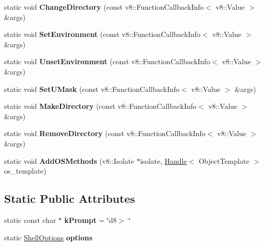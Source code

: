 \begin{DoxyCompactItemize}
\item 
\hypertarget{classv8_1_1_shell_aa08a16a91023b749f2d9e0956c8200e1}{}static void {\bfseries Change\+Directory} (const v8\+::\+Function\+Callback\+Info$<$ v8\+::\+Value $>$ \&args)\label{classv8_1_1_shell_aa08a16a91023b749f2d9e0956c8200e1}

\item 
\hypertarget{classv8_1_1_shell_a0977b415540cff06625e711b5d3e2625}{}static void {\bfseries Set\+Environment} (const v8\+::\+Function\+Callback\+Info$<$ v8\+::\+Value $>$ \&args)\label{classv8_1_1_shell_a0977b415540cff06625e711b5d3e2625}

\item 
\hypertarget{classv8_1_1_shell_ae7ac04fd17a20acf9fb66812b611170e}{}static void {\bfseries Unset\+Environment} (const v8\+::\+Function\+Callback\+Info$<$ v8\+::\+Value $>$ \&args)\label{classv8_1_1_shell_ae7ac04fd17a20acf9fb66812b611170e}

\item 
\hypertarget{classv8_1_1_shell_af3f66a1cd6b81cd69e43e9453092b50f}{}static void {\bfseries Set\+U\+Mask} (const v8\+::\+Function\+Callback\+Info$<$ v8\+::\+Value $>$ \&args)\label{classv8_1_1_shell_af3f66a1cd6b81cd69e43e9453092b50f}

\item 
\hypertarget{classv8_1_1_shell_a739dd021cf5875fe3b5372d4db31dbc3}{}static void {\bfseries Make\+Directory} (const v8\+::\+Function\+Callback\+Info$<$ v8\+::\+Value $>$ \&args)\label{classv8_1_1_shell_a739dd021cf5875fe3b5372d4db31dbc3}

\item 
\hypertarget{classv8_1_1_shell_aec493d82bcbc3295528d275f241cdfb6}{}static void {\bfseries Remove\+Directory} (const v8\+::\+Function\+Callback\+Info$<$ v8\+::\+Value $>$ \&args)\label{classv8_1_1_shell_aec493d82bcbc3295528d275f241cdfb6}

\item 
\hypertarget{classv8_1_1_shell_a966c06e523c68f1d95680b1119e663fa}{}static void {\bfseries Add\+O\+S\+Methods} (v8\+::\+Isolate $\ast$isolate, \hyperlink{classv8_1_1_handle}{Handle}$<$ Object\+Template $>$ os\+\_\+template)\label{classv8_1_1_shell_a966c06e523c68f1d95680b1119e663fa}

\end{DoxyCompactItemize}
\subsection*{Static Public Attributes}
\begin{DoxyCompactItemize}
\item 
\hypertarget{classv8_1_1_shell_a7ee0a4a60fc77b7db2b05e2485dc7792}{}static const char $\ast$ {\bfseries k\+Prompt} = \char`\"{}d8$>$ \char`\"{}\label{classv8_1_1_shell_a7ee0a4a60fc77b7db2b05e2485dc7792}

\item 
\hypertarget{classv8_1_1_shell_aedbe06af26de0fe7e4618cac0ce45790}{}static \hyperlink{classv8_1_1_shell_options}{Shell\+Options} {\bfseries options}\label{classv8_1_1_shell_aedbe06af26de0fe7e4618cac0ce45790}

\end{DoxyCompactItemize}


